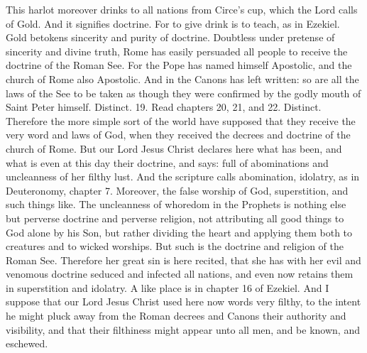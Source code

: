 This harlot moreover drinks to all nations from Circe’s cup, which the Lord calls of Gold. And it signifies doctrine. For to give drink is to teach, as in Ezekiel. Gold betokens sincerity and purity of doctrine. Doubtless under pretense of sincerity and divine truth, Rome has easily persuaded all people to receive the doctrine of the Roman See. For the Pope has named himself Apostolic, and the church of Rome also Apostolic. And in the Canons has left written: so are all the laws of the See to be taken as though they were confirmed by the godly mouth of Saint Peter himself. Distinct. 19. Read chapters 20, 21, and 22. Distinct. Therefore the more simple sort of the world have supposed that they receive the very word and laws of God, when they received the decrees and doctrine of the church of Rome. But our Lord Jesus Christ declares here what has been, and what is even at this day their doctrine, and says: full of abominations and uncleanness of her filthy lust. And the scripture calls abomination, idolatry, as in Deuteronomy, chapter 7. Moreover, the false worship of God, superstition, and such things like. The uncleanness of whoredom in the Prophets is nothing else but perverse doctrine and perverse religion, not attributing all good things to God alone by his Son, but rather dividing the heart and applying them both to creatures and to wicked worships. But such is the doctrine and religion of the Roman See. Therefore her great sin is here recited, that she has with her evil and venomous doctrine seduced and infected all nations, and even now retains them in superstition and idolatry. A like place is in chapter 16 of Ezekiel. And I suppose that our Lord Jesus Christ used here now words very filthy, to the intent he might pluck away from the Roman decrees and Canons their authority and visibility, and that their filthiness might appear unto all men, and be known, and eschewed.

